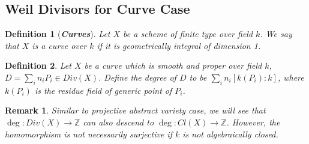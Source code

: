 \documentclass{ctexart}
\newtheorem{definition}{Definition}[section]
\newtheorem{remark}{Remark}[section]
\begin{document}
\subsection{Weil Divisors for Curve Case}
\begin{definition}[\textbf{\emph{Curves}}]
    Let $X$ be a scheme of finite type over field $k$.
    We say that $X$ is a curve over $k$ if it is geometrically integral of dimension 1.
\end{definition}
\begin{definition}
    Let $X$ be a curve which is smooth and proper over field $k$, $D = \sum_{i} n_{i}P_{i}\in Div(X)$.
    Define the degree of $D$ to be $\sum_{i} n_{i}[k(P_{i}) : k]$, where $k(P_{i})$ is the residue field of generic point of $P_{i}$.
\end{definition}
\begin{remark}
    Similar to projective abstract variety case, we will see that $\deg: Div(X) \longrightarrow \mathbb{Z}$ can also descend to $\deg: Cl(X) \longrightarrow \mathbb{Z}$.
    However, the homomorphism is not necessarily surjective if $k$ is not algebraically closed.
\end{remark}
\end{document}
